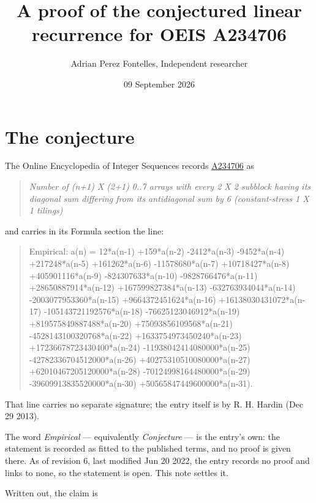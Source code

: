\documentclass[11pt]{article}
\title{A proof of the conjectured linear recurrence for OEIS A234706}
\author{Adrian Perez Fontelles, Independent researcher}
\date{09 September 2026}
\theoremstyle{definition}
\begin{document}
\maketitle
\section{The conjecture}

The Online Encyclopedia of Integer Sequences records \href{https://oeis.org/A234706}{A234706} as

\begin{quote}\itshape Number of (n+1) X (2+1) 0..7 arrays with every 2 X 2 subblock having its diagonal sum differing from its antidiagonal sum by 6 (constant-stress 1 X 1 tilings)\end{quote}

and carries in its Formula section the line:

\begin{quote}\ttfamily Empirical: a(n) = 12*a(n-1) +159*a(n-2) -2412*a(n-3) -9452*a(n-4) +217248*a(n-5) +161262*a(n-6) -11578680*a(n-7) +10718427*a(n-8) +405901116*a(n-9) -824307633*a(n-10) -9828766476*a(n-11) +28650887914*a(n-12) +167599827384*a(n-13) -632763934044*a(n-14) -2003077953360*a(n-15) +9664372451624*a(n-16) +16138030431072*a(n-17) -105143721192576*a(n-18) -76625123046912*a(n-19) +819575849887488*a(n-20) +75093856109568*a(n-21) -4528143100320768*a(n-22) +1633754973450240*a(n-23) +17236678723430400*a(n-24) -11938042414080000*a(n-25) -42782336704512000*a(n-26) +40275310510080000*a(n-27) +62010467205120000*a(n-28) -70124998164480000*a(n-29) -39609913835520000*a(n-30) +50565847449600000*a(n-31).\end{quote}

That line carries no separate signature; the entry itself is by R. H. Hardin (Dec 29 2013).

The word {\itshape Empirical} --- equivalently {\itshape Conjecture} --- is the entry's own: the statement is recorded as fitted to the published terms, and no proof is given there. As of revision 6, last modified Jun 20 2022, the entry records no proof and links to none, so the statement is open. This note settles it.

Written out, the claim is
\end{document}
